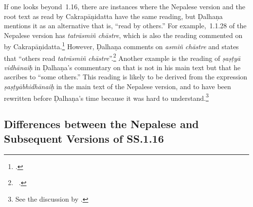 If one looks beyond \SS\,1.16, there are instances where the Nepalese version and
the root text as read by Cakrapāṇidatta have the same reading, but Ḍalhaṇa
mentions it as an alternative that is, “read by others.” For example, \SS\,1.1.28 of
the Nepalese version has \emph{tatrāsmiñ chāstre}, which is also the reading
commented on by Cakrapāṇidatta.\footcite[17]{acar-1939} However, Ḍalhaṇa comments
on \emph{asmiñ chāstre} and states that “others read \emph{tatrāsmiñ
    chāstre}”.\footnote{\SS\ .} %
Another example is the reading of \emph{ṣaṣṭyā vidhānaiḥ} in Ḍalhaṇa's commentary
on  that is not in his main text but that he ascribes to “some
others.” This reading is likely to be derived  from the expression
\emph{ṣaṣṭyābhidhānaiḥ} in the main text of the Nepalese version, and to have been 
rewritten before Ḍalhaṇa's time because it was hard to understand.\footnote{See
the discussion by \citet[4--5]{birc-2021a}.}


\subsection{Differences between the Nepalese and Subsequent Versions of SS.1.16}


